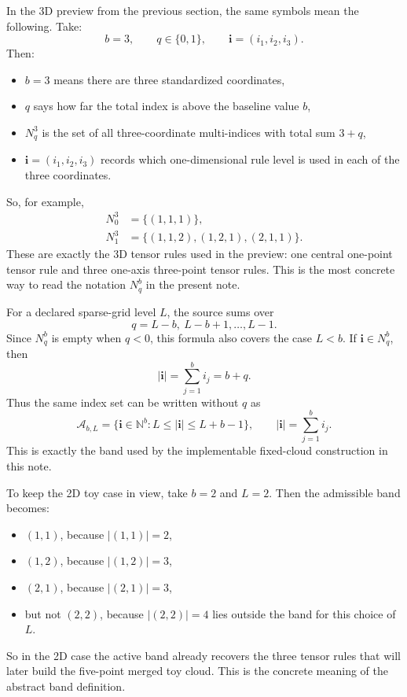 \documentclass[11pt]{article}
\numberwithin{equation}{section}
\begin{document}
In the 3D preview from the previous section, the same symbols mean the following.
Take:
\begin{equation}
  b=3,
  \qquad
  q\in\{0,1\},
  \qquad
  \mathbf i=(i_1,i_2,i_3).
  \label{eq:p38-3d-index-symbols}
\end{equation}
Then:
\begin{itemize}[leftmargin=0.28in]
  \item \(b=3\) means there are three standardized coordinates,
  \item \(q\) says how far the total index is above the baseline value \(b\),
  \item \(N_q^3\) is the set of all three-coordinate multi-indices with total
  sum \(3+q\),
  \item \(\mathbf i=(i_1,i_2,i_3)\) records which one-dimensional rule level is
  used in each of the three coordinates.
\end{itemize}
So, for example,
\begin{align}
  N_0^3 &= \{(1,1,1)\},
  \label{eq:p38-N03}\\
  N_1^3 &= \{(1,1,2),(1,2,1),(2,1,1)\}.
  \label{eq:p38-N13}
\end{align}
These are exactly the 3D tensor rules used in the preview: one central
one-point tensor rule and three one-axis three-point tensor rules.  This is the
most concrete way to read the notation \(N_q^b\) in the present note.

For a declared sparse-grid level \(L\), the source sums over
\[
  q=L-b,\ L-b+1,\ldots,L-1.
\]
Since \(N_q^b\) is empty when \(q<0\), this formula also covers the case
\(L<b\).  If \(\mathbf i\in N_q^b\), then
\begin{equation}
  |\mathbf i|=\sum_{j=1}^b i_j=b+q.
  \label{eq:p32-index-sum-q}
\end{equation}
Thus the same index set can be written without \(q\) as
\begin{equation}
  \mathcal A_{b,L}
  =
  \{\mathbf i\in\mathbb N^b: L\le |\mathbf i|\le L+b-1\},
  \qquad |\mathbf i|=\sum_{j=1}^b i_j.
  \label{eq:p31-level-band}
\end{equation}
This is exactly the band used by the implementable fixed-cloud construction in
this note.

To keep the 2D toy case in view, take \(b=2\) and \(L=2\).  Then the admissible
band becomes:
\begin{itemize}[leftmargin=0.28in]
  \item \((1,1)\), because \(|(1,1)|=2\),
  \item \((1,2)\), because \(|(1,2)|=3\),
  \item \((2,1)\), because \(|(2,1)|=3\),
  \item but not \((2,2)\), because \(|(2,2)|=4\) lies outside the band for this
  choice of \(L\).
\end{itemize}
So in the 2D case the active band already recovers the three tensor rules that
will later build the five-point merged toy cloud.  This is the concrete meaning
of the abstract band definition.
\end{document}
